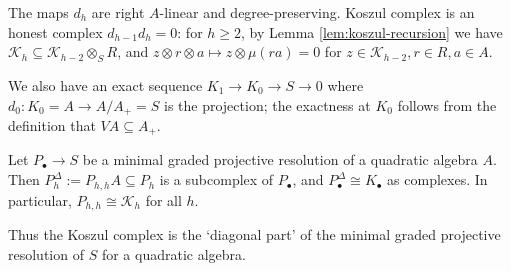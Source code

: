 The maps $d_h$ are right $A$-linear and degree-preserving.
Koszul complex is an honest complex $d_{h-1}d_h=0$: for $h\geq2$, by Lemma \ref{lem:koszul-recursion} we have $\mathcal K_h\subseteq\mathcal K_{h-2}\otimes_SR$, and $z\otimes r\otimes a\mapsto z\otimes\mu(ra)=0$ for $z\in\mathcal{K}_{h-2}, r\in R, a\in A$.

We also have an exact sequence $K_1\to K_0\to S\to 0$ where $d_0:K_0=A\to A/A_+=S$ is the projection; the exactness at $K_0$ follows from the definition that $VA\subseteq A_+$.

\begin{theorem}\label{thm:koszul-complex-diagonal}
Let $P_\bullet\to S$ be a minimal graded projective resolution of a quadratic algebra $A$.
Then $P^\Delta_h:=P_{h,h}A\subseteq P_h$ is a subcomplex of $P_\bullet$, and $P^\Delta_\bullet\cong K_\bullet$ as complexes.
In particular, $P_{h,h}\cong\mathcal K_h$ for all $h$.
\end{theorem}

Thus the Koszul complex is the `diagonal part' of the minimal graded projective resolution of $S$ for a quadratic algebra.

